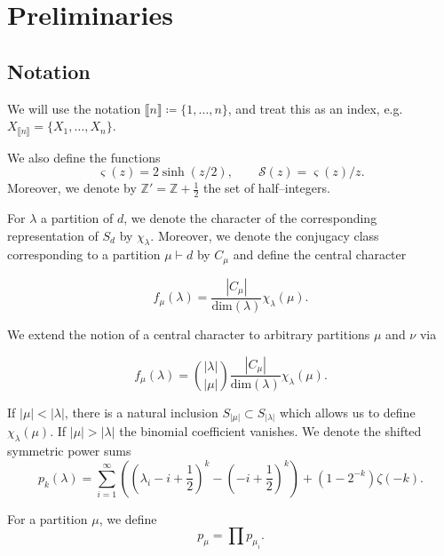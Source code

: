 \documentclass[10pt,a4paper,oneside,no-math,reqno]{amsart}%
\theoremstyle{plain}
\theoremstyle{definition}
\theoremstyle{remark}
\numberwithin{equation}{section}
\newcommand{\mb}[1]{\mathbb{#1}}
\newcommand{\1}{\mathds{1}}
\newcommand{\Z}{\mb{Z}}
\newcommand{\<}{\langle}
\renewcommand{\>}{\rangle}
\begin{document}
\section{Preliminaries}\label{Preliminaries}

\subsection{Notation}

We will use the notation $ \llbracket n \rrbracket \coloneqq \{ 1, \dotsc, n\}$, and treat this as an index, e.g. $ X_{\llbracket n \rrbracket} = \{ X_1, \dotsc, X_n \}$.

We also define the functions
\begin{equation}
    \varsigma(z)
    =
    2\sinh(z/2) , 
    \qquad 
    \mathcal{S}(z)
    =
    \varsigma(z)/z .
\end{equation} 
Moreover, we denote by $\mathbb{Z}' = \Z + \frac{1}{2}$ the set of half--integers.

For $\lambda$ a partition of $d$, we denote the character of the corresponding representation of $S_d$ by $\chi_\lambda$. Moreover, we denote the conjugacy class corresponding to a partition $\mu\vdash d$ by $C_\mu$ and define the central character

\begin{equation}
    f_\mu(\lambda)
    =
    \frac{|C_\mu|}{\mathrm{dim}(\lambda)} \chi_\lambda(\mu).
\end{equation}

We extend the notion of a central character to arbitrary partitions $\mu$ and $\nu$ via

\begin{equation}
    f_\mu(\lambda)
    =
    \binom{|\lambda|}{|\mu|} \frac{|C_\mu|}{\mathrm{dim}(\lambda)} \chi_\lambda(\mu).
\end{equation}

If $|\mu|<|\lambda|$, there is a natural inclusion $S_{|\mu|}\subset S_{|\lambda|}$ which allows us to define $\chi_\lambda(\mu)$. If $|\mu|>|\lambda|$ the binomial coefficient vanishes.
 We denote the shifted symmetric power sums 
 \begin{equation}
     p_k(\lambda)
     =
     \sum_{i=1}^\infty \left( (\lambda_i-i+\frac{1}{2})^k-(-i+\frac{1}{2})^k\right) + (1-2^{-k}) \zeta(-k).   
 \end{equation}

 For a partition $\mu$, we define
 \begin{equation}
     p_\mu
     =
     \prod p_{\mu_i}.
 \end{equation}
\end{document}
